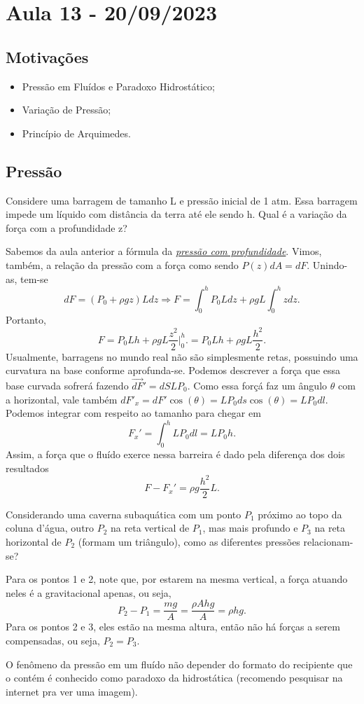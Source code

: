 \documentclass[PhysicsII/physicsII_notes.tex]{subfiles}
\begin{document}
\section{Aula 13 - 20/09/2023}
\subsection{Motivações}
\begin{itemize}
	\item Pressão em Fluídos e Paradoxo Hidrostático;
	\item Variação de Pressão;
	\item Princípio de Arquimedes.
\end{itemize}
\subsection{Pressão}
\begin{example}
	Considere uma barragem de tamanho L e pressão inicial de 1 atm. Essa barragem impede um líquido com distância da terra até ele sendo h.
	Qual é a variação da força com a profundidade z?

	Sabemos da aula anterior a fórmula da \textit{\hyperlink{pressure_submerging}{pressão com profundidade}}. Vimos, também, a relação da pressão com a força
	como sendo \(P(z)dA = dF\). Unindo-as, tem-se
	\[
		dF = (P_{0}+\rho gz)Ldz \Rightarrow F = \int_{0}^{h}P_{0}Ldz + \rho gL \int_{0}^{h}z dz.
	\]
	Portanto,
	\[
		F = P_{0}Lh + \rho gL \frac{z^{2}}{2}\biggl|_{0}^{h}\biggr. = P_{0}Lh + \rho gL \frac{h^{2}}{2}.
	\]
	Usualmente, barragens no mundo real não são simplesmente retas, possuindo uma curvatura na base conforme aprofunda-se. Podemos descrever
	a força que essa base curvada sofrerá fazendo \(\vec{dF}' = dS L P_{0}\). Como essa forçá faz um ângulo \(\theta \) com a horizontal, vale também
	\(dF'_{x} = dF'\cos{(\theta )} = LP_{0}ds\cos{(\theta )} = LP_{0}dl.\) Podemos integrar com respeito ao tamanho para chegar em
	\[
		F_{x}' = \int_{0}^{h}LP_{0}dl = LP_{0}h.
	\]
	Assim, a força que o fluído exerce nessa barreira é dado pela diferença dos dois resultados
	\[
		F - F_{x}' = \rho g \frac{h^{2}}{2}L.
	\]
\end{example}
\begin{example}
	Considerando uma caverna subaquática com um ponto \(P_{1}\) próximo ao topo da coluna d'água,
	outro \(P_{2}\) na reta vertical de \(P_{1}\), mas mais profundo e \(P_{3}\) na reta horizontal de \(P_{2}\)
	(formam um triângulo), como as diferentes pressões relacionam-se?

	Para os pontos 1 e 2, note que, por estarem na mesma vertical, a força atuando neles é a gravitacional apenas, ou seja,
	\[
		P_{2} - P_{1} = \frac{mg}{A} = \frac{\rho Ahg}{A} = \rho hg.
	\]
	Para os pontos 2 e 3, eles estão na mesma altura, então não há forças a serem compensadas, ou seja, \(P_{2} = P_{3}\).
\end{example}
O fenômeno da pressão em um fluído não depender do formato do recipiente que o contém é conhecido como paradoxo da hidrostática (recomendo pesquisar na internet pra ver uma imagem).
\end{document}
